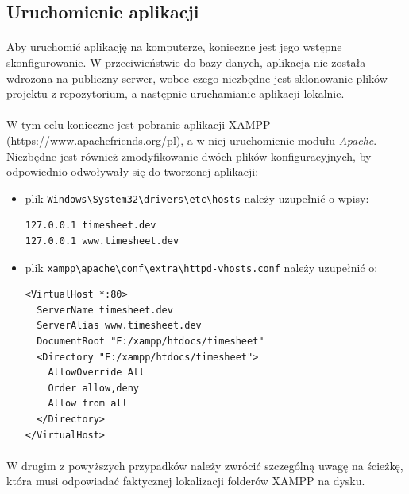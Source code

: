 \documentclass[a4paper, 12pt, oneside]{article}
\begin{document}
		\subsection{Uruchomienie aplikacji}
			\paragraph{} Aby uruchomić aplikację na komputerze, konieczne jest jego wstępne skonfigurowanie. W przeciwieństwie do bazy danych, aplikacja nie została wdrożona na publiczny serwer, wobec czego niezbędne jest sklonowanie plików projektu z repozytorium, a następnie uruchamianie aplikacji lokalnie.
			\paragraph{}W tym celu konieczne jest pobranie aplikacji XAMPP (\url{https://www.apachefriends.org/pl}), a w niej uruchomienie modułu \textit{Apache}. Niezbędne jest również zmodyfikowanie dwóch plików konfiguracyjnych, by odpowiednio odwoływały się do tworzonej aplikacji:
			\begin{itemize}
				\item plik \verb+Windows\System32\drivers\etc\hosts+ należy uzupełnić o wpisy:
				\begin{footnotesize}
				\begin{lstlisting}[frame=single]  
127.0.0.1 timesheet.dev 
127.0.0.1 www.timesheet.dev
\end{lstlisting}
\end{footnotesize}
				\item plik \verb+xampp\apache\conf\extra\httpd-vhosts.conf+ należy uzupełnić o:
				\begin{footnotesize}
				\begin{lstlisting}[frame=single]  
<VirtualHost *:80>
  ServerName timesheet.dev
  ServerAlias www.timesheet.dev
  DocumentRoot "F:/xampp/htdocs/timesheet"
  <Directory "F:/xampp/htdocs/timesheet">
    AllowOverride All
    Order allow,deny
    Allow from all
  </Directory>
</VirtualHost>
\end{lstlisting}
\end{footnotesize}
			\end{itemize}
			
			\paragraph{}W drugim z powyższych przypadków należy zwrócić szczególną uwagę na ścieżkę, która musi odpowiadać faktycznej lokalizacji folderów XAMPP na dysku.
			
\end{document}
